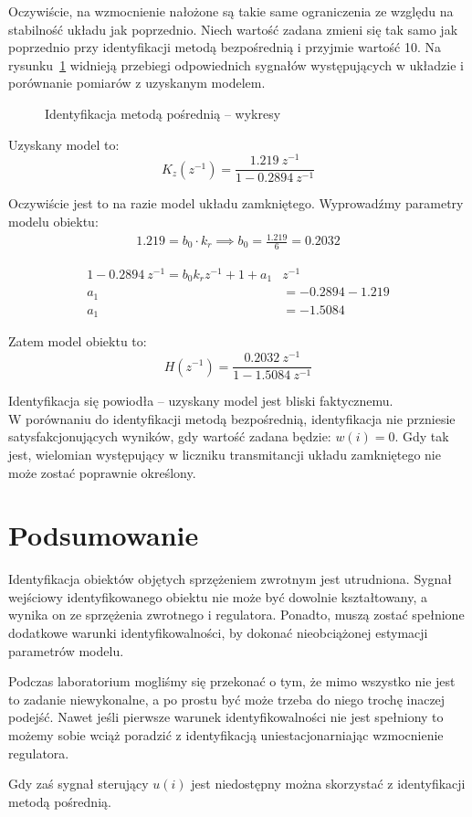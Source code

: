 \documentclass[11pt, a4paper]{article}
\begin{document}
Oczywiście, na wzmocnienie nałożone są takie same ograniczenia ze względu na stabilność układu jak poprzednio. Niech wartość zadana zmieni się tak samo jak poprzednio przy identyfikacji metodą bezpośrednią i przyjmie wartość 10. Na rysunku~\ref{fig:posr} widnieją przebiegi odpowiednich sygnałów występujących w układzie i porównanie pomiarów z uzyskanym modelem.
\begin{figure}[htbp!]
	\centering
	\hfill%
	\caption{Identyfikacja metodą pośrednią -- wykresy}
	\label{fig:posr}
\end{figure}

Uzyskany model to:
\[
	K_z(z^{-1}) = \frac{1.219 \ z^{-1}}{1 - 0.2894 \ z^{-1}}
\]

Oczywiście jest to na razie model układu zamkniętego. Wyprowadźmy parametry modelu obiektu:
\begin{gather*}
1.219 = b_0 \cdot k_r \implies b_0 = \frac{1.219}{6} = 0.2032
\end{gather*}

\begin{align*}
1 - 0.2894 \ z^{-1} = b_0 k_r z^{-1} + 1 + a_1& z^{-1} \\
a_1& = - 0.2894 - 1.219 \\
a_1& = -1.5084
\end{align*}

Zatem model obiektu to:
\[
	H(z^{-1}) = \frac{0.2032 \ z^{-1}}{1 - 1.5084 \ z^{-1}}
\]

Identyfikacja się powiodła -- uzyskany model jest bliski faktycznemu.\\

W porównaniu do identyfikacji metodą bezpośrednią, identyfikacja nie przniesie satysfakcjonujących wyników, gdy wartość zadana będzie: $w(i) = 0$. Gdy tak jest, wielomian występujący w liczniku transmitancji układu zamkniętego nie może zostać poprawnie określony.

\clearpage
\newpage
\section{Podsumowanie}

Identyfikacja obiektów objętych sprzężeniem zwrotnym jest utrudniona. Sygnał wejściowy identyfikowanego obiektu nie może być dowolnie kształtowany, a wynika on ze sprzężenia zwrotnego i regulatora. Ponadto, muszą zostać spełnione dodatkowe warunki identyfikowalności, by dokonać nieobciążonej estymacji parametrów modelu.

Podczas laboratorium mogliśmy się przekonać o tym, że mimo wszystko nie jest to zadanie niewykonalne, a po prostu być może trzeba do niego trochę inaczej podejść. Nawet jeśli pierwsze warunek identyfikowalności nie jest spełniony to możemy sobie wciąż poradzić z identyfikacją uniestacjonarniając wzmocnienie regulatora.

Gdy zaś sygnał sterujący $u(i)$ jest niedostępny można skorzystać z identyfikacji metodą pośrednią.
\end{document}
